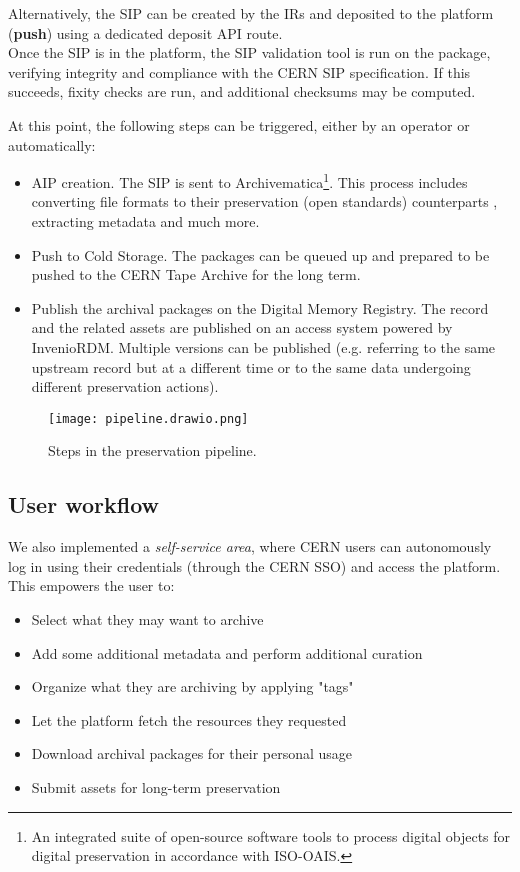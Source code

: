 \documentclass[11pt]{IEEEtran}
\begin{document}
Alternatively, the SIP can be created by the IRs and deposited to the platform (\textbf{push}) using a dedicated deposit API route.
\\

Once the SIP is in the platform, the SIP validation tool is run on the package, verifying integrity and compliance with the CERN SIP specification. If this succeeds, fixity checks are run, and additional checksums may be computed.

At this point, the following steps can be triggered, either by an operator or automatically:

\begin{itemize}
    \item AIP creation. The SIP is sent to Archivematica\footnote{An integrated suite\cite{Archivematica} of open-source software tools to process digital objects for digital preservation in accordance with ISO-OAIS.}. This process includes converting file formats to their preservation (open standards) counterparts \cite{FormatpoliciesArchivematica}, extracting metadata and much more.
    \item Push to Cold Storage. The packages can be queued up and prepared to be pushed to the CERN Tape Archive for the long term.
    \item Publish the archival packages on the Digital Memory Registry. The record and the related assets are published on an access system powered by InvenioRDM. Multiple versions can be published (e.g. referring to the same upstream record but at a different time or to the same data undergoing different preservation actions).
\end{itemize}

\begin{figure}
    \texttt{[image: pipeline.drawio.png]}
    \caption{Steps in the preservation pipeline.}
\end{figure}

\subsection{User workflow}

We also implemented a \textit{self-service area}, where CERN users can autonomously log in using their credentials (through the CERN SSO) and access the platform. This empowers the user to:

\begin{itemize}
    \item Select what they may want to archive
    \item Add some additional metadata and perform additional curation
    \item Organize what they are archiving by applying "tags"
    \item Let the platform fetch the resources they requested
    \item Download archival packages for their personal usage
    \item Submit assets for long-term preservation
\end{itemize}
\end{document}
